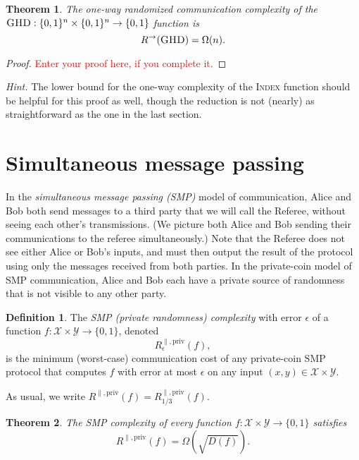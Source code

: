 \documentclass[11pt]{amsart}
\theoremstyle{plain}
\newtheorem{theorem}{Theorem}
\theoremstyle{definition}
\newtheorem{definition}{Definition}
\theoremstyle{plain}
\newcommand{\calX}{\mathcal{X}}
\newcommand{\calY}{\mathcal{Y}}
\newcommand{\GHD}{\textsc{GHD}}
\newcommand{\replacethistext}[1]{\textcolor{red}{#1}}
\begin{document}
\begin{theorem}
The one-way randomized communication complexity of the $\GHD : \{0,1\}^n \times \{0,1\}^n \to \{0,1\}$ function is
\[
R^\rightarrow(\GHD) = \Omega(n).
\]
\end{theorem}

\begin{proof}
\replacethistext{Enter your proof here, if you complete it.}
\end{proof}


\bigskip
\emph{Hint.} The lower bound for the one-way complexity of the \textsc{Index} function should be helpful for this proof as well, though the reduction is not (nearly) as straightforward as the one in the last section.


\newpage 
\section{Simultaneous message passing}

In the \emph{simultaneous message passing (SMP)} model of communication, Alice and Bob both send messages to a third party that we will call the Referee, without seeing each other's transmissions. (We picture both Alice and Bob sending their communications to the referee simultaneously.) Note that the Referee does not see either Alice or Bob's inputs, and must then output the result of the protocol using only the messages received from both parties. In the private-coin model of SMP communication, Alice and Bob each have a private source of randomness that is not visible to any other party.

\begin{definition}
The \emph{SMP (private randomness) complexity} with error $\epsilon$ of a function $f : \calX \times \calY \to \{0,1\}$, denoted
\[
R^{\parallel,\mathrm{priv}}_\epsilon(f),
\] 
is the minimum (worst-case) communication cost of any private-coin SMP protocol that computes $f$ with error at most $\epsilon$ on any input $(x,y) \in \calX \times \calY$.
\end{definition}

As usual, we write $R^{\parallel,\mathrm{priv}}(f) = R^{\parallel,\mathrm{priv}}_{1/3}(f)$.

\begin{theorem}
The SMP complexity of every function $f : \calX \times \calY \to \{0,1\}$ satisfies
\[
R^{\parallel,\mathrm{priv}}(f) = \Omega(\sqrt{D(f)}).
\]
\end{theorem}
\end{document}
